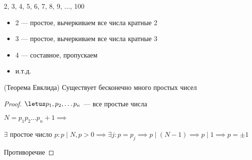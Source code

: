 2, 3, 4, 5, 6, 7, 8, 9, $\ldots$, 100

\begin{itemize}
    \item 2 --- простое, вычеркиваем все числа кратные 2
    
    \item 3 --- простое, вычеркиваем все числа кратные 3
    
    \item 4 --- составное, пропускаем
    
    \item и.т.д.
\end{itemize}

\begin{theorem}(Теорема Евклида)
    Существует бесконечно много простых чисел
\end{theorem}

\begin{proof}
    $\letus p_1, p_2, \ldots p_n$ --- все простые числа
    
    $N = p_1 p_2 \ldots p_n + 1 \implies$
    
    $\exists$ простое число $p : p \mid N, p > 0 \implies \exists j: p = p_j \implies p \mid (N - 1) \implies p \mid 1 \implies p = \pm 1$
    
    Противоречие 
\end{proof}
